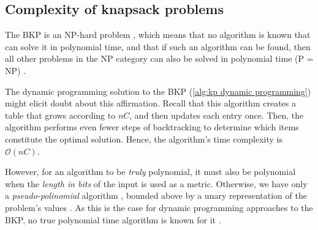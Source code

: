 \subsection{Complexity of knapsack problems}

The BKP is an NP-hard problem \cite{PISINGER2005}, which means that no algorithm is known that can solve it in polynomial time, and that if such an algorithm can be found, then all other problems in the NP category can also be solved in polynomial time (P = NP) \cite{ERICKSON2019}.

The dynamic programming solution to the BKP (\cref{alg:kp dynamic programming}) might elicit doubt about this affirmation. Recall that this algorithm creates a table that grows according to $nC$, and then updates each entry once. Then, the algorithm performs even fewer steps of backtracking to determine which items constitute the optimal solution. Hence, the algorithm's time complexity is $\mathcal{O}(nC)$.

However, for an algorithm to be \emph{truly} polynomial, it must also be polynomial when the \emph{length in bits} of the input is used as a metric. Otherwise, we have only a \emph{pseudo-polinomial} algorithm \cite{WENDLAND}, bounded above by a unary representation of the problem's values \cite{ERICKSON2019,VAZIRANI2001}. As this is the case for dynamic programming approaches to the BKP, no true polynomial time algorithm is known for it \cite{DUDLEY2016,PISINGER2005}.

